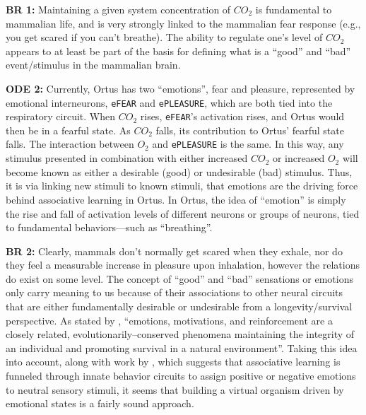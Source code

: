 \documentclass[letterpaper]{article}
\begin{document}
\textbf{BR 1:} Maintaining a given system concentration of $CO_2$ is fundamental to mammalian life, and is very strongly linked to the mammalian fear response (e.g., you get scared if you can't breathe). The ability to regulate one's level of $CO_2$ appears to at least be part of the basis for defining what is a ``good'' and ``bad'' event/stimulus in the mammalian brain.

\textbf{ODE 2:} Currently, Ortus has two ``emotions'', fear and pleasure, represented by emotional interneurons, \texttt{eFEAR} and \texttt{ePLEASURE}, which are both tied into the respiratory circuit. When $CO_2$ rises, \texttt{eFEAR}'s activation rises, and Ortus would then be in a fearful state. As $CO_2$ falls, its contribution to Ortus' fearful state falls. The interaction between $O_2$ and \texttt{ePLEASURE} is the same. In this way, any stimulus presented in combination with either increased $CO_2$ or increased $O_2$ will become known as either a desirable (good) or undesirable (bad) stimulus. Thus, it is via linking new stimuli to known stimuli, that emotions are the driving force behind associative learning in Ortus. In Ortus, the idea of ``emotion'' is simply the rise and fall of activation levels of different neurons or groups of neurons, tied to fundamental behaviors---such as ``breathing''.

\textbf{BR 2:} Clearly, mammals don't normally get scared when they exhale, nor do they feel a measurable increase in pleasure upon inhalation, however the relations do exist on some level. The concept of ``good'' and ``bad'' sensations or emotions only carry meaning to us because of their associations to other neural circuits that are either fundamentally desirable or undesirable from a longevity/survival perspective.
As stated by \citet{Verma2015}, ``emotions, motivations, and reinforcement are a closely related, evolutionarily--conserved phenomena maintaining the integrity of an individual and promoting survival in a natural environment''. Taking this idea into account, along with work by \citet{Gore2015}, which suggests that associative learning is funneled through innate behavior circuits to assign positive or negative emotions to neutral sensory stimuli, it seems that building a virtual organism driven by emotional states is a fairly sound approach. 
\end{document}
